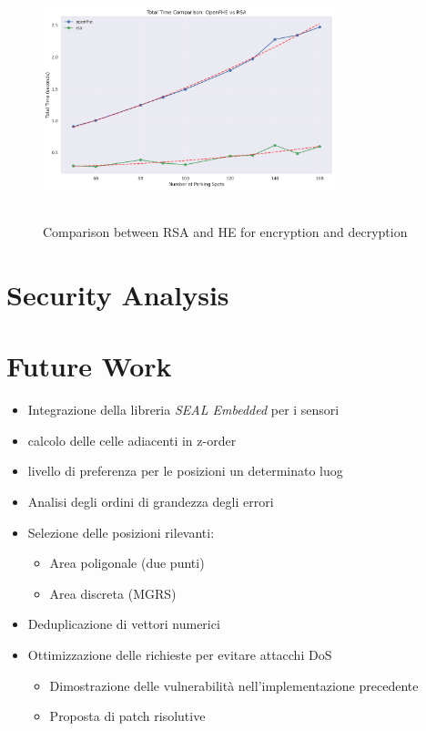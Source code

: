 \begin{figure}[h]
    \centering
    \includegraphics[width=8.5cm,height=7cm]{img/total_time_comparison.png}
    \caption{Comparison between RSA and HE for encryption and decryption}
    \label{fig:he-vs-rsa}
\end{figure}

\section{Security Analysis}



\section{Future Work}
\begin{itemize}
    \item Integrazione della libreria \emph{SEAL Embedded} per i sensori
    \item calcolo delle celle adiacenti in z-order
    \item livello di preferenza per le posizioni un determinato luog
    \item Analisi degli ordini di grandezza degli errori
    \item Selezione delle posizioni rilevanti:
    \begin{itemize}
        \item Area poligonale (due punti)
        \item Area discreta (MGRS)
    \end{itemize}
    \item Deduplicazione di vettori numerici
    \item Ottimizzazione delle richieste per evitare attacchi DoS
    \begin{itemize}
        \item Dimostrazione delle vulnerabilità nell'implementazione precedente
        \item Proposta di patch risolutive
    \end{itemize}
\end{itemize}


